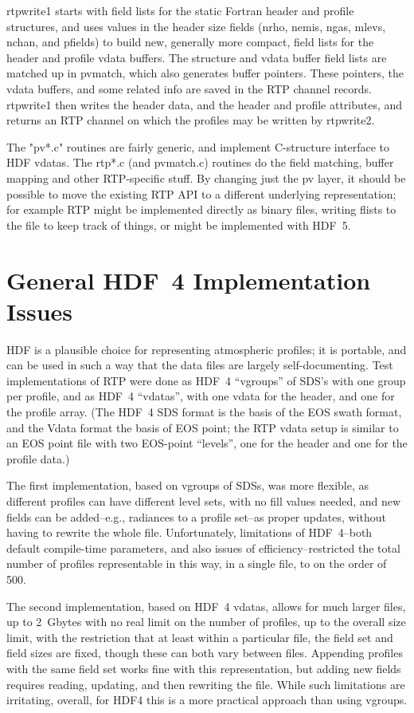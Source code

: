 \documentclass[12pt]{article}
\begin{document}
rtpwrite1 starts with field lists for the static Fortran header and
profile structures, and uses values in the header size fields (nrho,
nemis, ngas, mlevs, nchan, and pfields) to build new, generally more
compact, field lists for the header and profile vdata buffers.  The
structure and vdata buffer field lists are matched up in pvmatch,
which also generates buffer pointers.  These pointers, the vdata
buffers, and some related info are saved in the RTP channel records.
rtpwrite1 then writes the header data, and the header and profile
attributes, and returns an RTP channel on which the profiles may
be written by rtpwrite2.

The "pv*.c" routines are fairly generic, and implement C-structure
interface to HDF vdatas.  The rtp*.c (and pvmatch.c) routines do the
field matching, buffer mapping and other RTP-specific stuff.  By
changing just the pv layer, it should be possible to move the
existing RTP API to a different underlying representation; for
example RTP might be implemented directly as binary files, writing
flists to the file to keep track of things, or might be implemented
with HDF~5.


\section{General HDF~4 Implementation Issues}

HDF is a plausible choice for representing atmospheric profiles;
it is portable, and can be used in such a way that the data files
are largely self-documenting.  Test implementations of RTP were
done as HDF~4 ``vgroups'' of SDS's with one group per profile, and
as HDF~4 ``vdatas'', with one vdata for the header, and one for the
profile array.  (The HDF~4 SDS format is the basis of the EOS swath
format, and the Vdata format the basis of EOS point; the RTP vdata
setup is similar to an EOS point file with two EOS-point
``levels'', one for the header and one for the profile data.)

The first implementation, based on vgroups of SDSs, was more
flexible, as different profiles can have different level sets, with
no fill values needed, and new fields can be added--e.g., radiances
to a profile set--as proper updates, without having to rewrite the
whole file.  Unfortunately, limitations of HDF~4--both default
compile-time parameters, and also issues of efficiency--restricted
the total number of profiles representable in this way, in a single
file, to on the order of 500.

The second implementation, based on HDF~4 vdatas, allows for much
larger files, up to 2~Gbytes with no real limit on the number of
profiles, up to the overall size limit, with the restriction that at
least within a particular file, the field set and field sizes are
fixed, though these can both vary between files.  Appending profiles
with the same field set works fine with this representation, but
adding new fields requires reading, updating, and then rewriting the
file.  While such limitations are irritating, overall, for HDF4 this
is a more practical approach than using vgroups.
\end{document}
